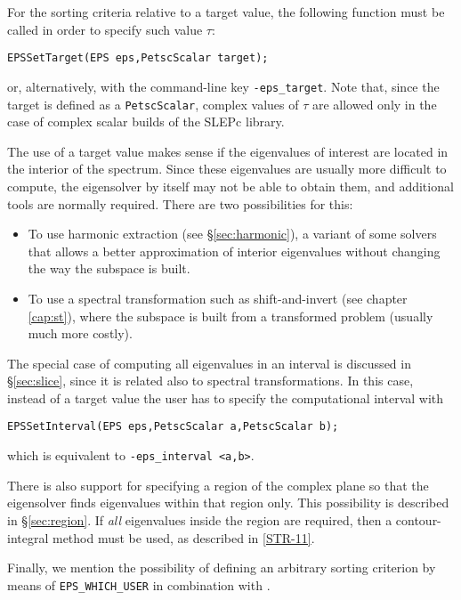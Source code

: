 	For the sorting criteria relative to a target value, the following function must be called in order to specify such value $\tau$:
	\begin{Verbatim}[fontsize=\small]
	EPSSetTarget(EPS eps,PetscScalar target);
	\end{Verbatim}
or, alternatively, with the command-line key \Verb!-eps_target!. Note that, since the target is defined as a \texttt{PetscScalar}, complex values of $\tau$ are allowed only in the case of complex scalar builds of the SLEPc library.

The use of a target value makes sense if the eigenvalues of interest are located in the interior of the spectrum. Since these eigenvalues are usually more difficult to compute, the eigensolver by itself may not be able to obtain them, and additional tools are normally required.
There are two possibilities for this:
\begin{itemize}
\item To use harmonic extraction (see \S\ref{sec:harmonic}), a variant of some solvers that allows a better approximation of interior eigenvalues without changing the way the subspace is built.
\item To use a spectral transformation such as shift-and-invert (see chapter \ref{cap:st}), where the subspace is built from a transformed problem (usually much more costly).
\end{itemize}

The special case of computing all eigenvalues in an interval is discussed in \S\ref{sec:slice}, since it is related also to spectral transformations. In this case, instead of a target value the user has to specify the computational interval with
	\begin{Verbatim}[fontsize=\small]
	EPSSetInterval(EPS eps,PetscScalar a,PetscScalar b);
	\end{Verbatim}
which is equivalent to \Verb!-eps_interval <a,b>!.

There is also support for specifying a region of the complex plane so that the eigensolver finds eigenvalues within that region only. This possibility is described in \S\ref{sec:region}. If \emph{all} eigenvalues inside the region are required, then a contour-integral method must be used, as described in \hyperlink{str}{[STR-11]}.

Finally, we mention the possibility of defining an arbitrary sorting criterion by means of \texttt{EPS\_WHICH\_USER} in combination with .

